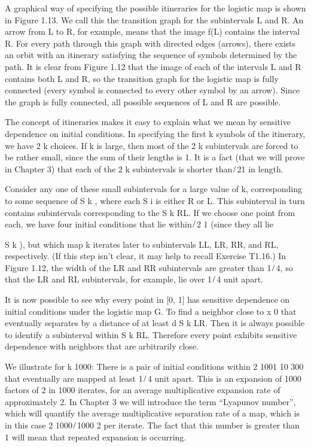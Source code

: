 A graphical way of specifying the possible itineraries for the logistic map is shown in Figure 1.13. We 
call this the transition graph for the subintervals L and R. An arrow from L to R, for example, means that 
the image f(L) contains the interval R. For every path through this graph with directed edges (arrows), 
there exists an orbit with an itinerary satisfying the sequence of symbols determined by the path. It is 
clear from Figure 1.12 that the image of each of the intervals L and R contains both L and R, so the 
transition graph for the logistic map is fully connected (every symbol is connected to every other symbol 
by an arrow). Since the graph is fully connected, all possible sequences of L and R are possible.

The concept of itineraries makes it easy to explain what we mean by sensitive dependence on initial 
conditions. In specifying the ﬁrst k symbols of the itinerary, we have 2 k choices. If k is large, then 
most of the 2 k subintervals are forced to be rather small, since the sum of their lengths is 1. It is a 
fact (that we will prove in Chapter 3) that each of the 2 k subintervals is shorter than   ̸ 21  in length.

Consider any one of these small subintervals for a large value of k, corresponding to some sequence of 
 S k , where each S i is either R or L. This subinterval in turn contains subintervals corresponding to the 
 S k RL. If we choose one point from each, we have four initial conditions that lie within 
 ̸ 2 1 (since they all lie

 S k ), but which map k iterates later to subintervals LL, LR, RR, and RL, respectively. (If this step 
isn’t clear, it may help to recall Exercise T1.16.) In Figure 1.12, the width of the LR and RR subintervals 
are greater than 1 ̸ 4, so that the LR and RL subintervals, for example, lie over 1 ̸ 4 unit apart.

It is now possible to see why every point in [0, 1] has sensitive dependence on initial conditions under 
the logistic map G. To ﬁnd a neighbor close to x 0 that eventually separates by a distance of at least d  
 S k LR. Then it is always possible to identify a subinterval within 
 S k RL. Therefore every point exhibits sensitive dependence with neighbors that are arbitrarily close.

We illustrate for k  1000: There is a pair of initial conditions within 2 1001  10 300 that eventually are 
mapped at least 1 ̸ 4 unit apart. This is an expansion of 1000 factors of 2 in 1000 iterates, for an average 
multiplicative expansion rate of approximately 2. In Chapter 3 we will introduce the term “Lyapunov 
number”, which will quantify the average multiplicative separation rate of a map, which is in this case 2 
1000 ̸ 1000  2 per iterate. The fact that this number is greater than 1 will mean that repeated expansion is 
occurring.

